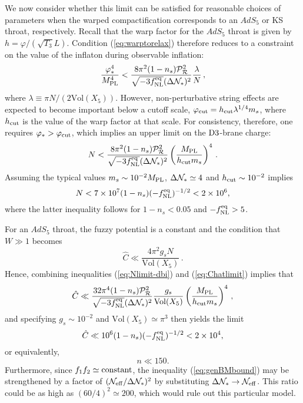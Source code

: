 We now consider whether this limit can be satisfied for reasonable choices 
of parameters when the warped compactification corresponds to 
an $AdS_5$ or KS throat, respectively. Recall that the warp 
factor for the $AdS_5$ throat is given by $h=\varphi/(\sqrt{T_3}L)$.  
Condition (\ref{eq:warptorelax}) therefore reduces to a constraint on the 
value of the inflaton during observable inflation: 
% 
\begin{equation}
\label{eq:phivalue-dbi}
\frac{\varphi_*^4}{M_{\mathrm{PL}}^4} < 
\frac{8\pi^2 (1-n_s)\mathcal{P}_{\mathcal{R}}^2 }{\sqrt{-3f_{\mathrm{NL}}^{\mathrm{eq}}} ( \Delta \mathcal{N}_*)^2} 
\frac{\lambda}{N} \,,
\end{equation}
%  
where $\lambda \equiv \pi N/(2 \mathrm{Vol}(X_5))$. 
However, non-perturbative string effects are expected to become 
important below a cutoff scale, $\varphi_{\rm cut} = 
h_{\rm cut} \lambda^{1/4} m_s$, where $h_{\rm cut}$ is the value of the 
warp factor at that scale. For consistency, therefore, one requires 
$\varphi_*>\varphi_{\rm cut}$, which implies an upper limit on the 
${\rm D3}$-brane charge: 
% 
\begin{equation}
\label{eq:Nlimit-dbi}
N< \frac{8\pi^2 (1-n_s)\mathcal{P}_{\mathcal{R}}^2 }{\sqrt{-3f_{\mathrm{NL}}^{\mathrm{eq}}} ( \Delta \mathcal{N}_*)^2}
\left( \frac{M_{\mathrm{PL}}}{h_{\rm cut}m_s} \right)^4  \,.
\end{equation}
% 
Assuming the typical values $m_s \sim 10^{-2}M_{\mathrm{PL}}$, 
$\Delta \mathcal{N}_* \simeq 4$ and 
$h_{\rm cut} \sim 10^{-2}$ implies
%   
\begin{equation}
N < 7 \times 10^7 (1-n_s)(-f_{\mathrm{NL}}^{\mathrm{eq}})^{-1/2} < 2\times 10^6, 
\end{equation}
% 
where 
the latter inequality follows for $1-n_s <0.05$ and $-f_{\mathrm{NL}}^{\mathrm{eq}}>5$. 


For an $AdS_5$ throat, the fuzzy potential 
is a constant and the condition that $W \gg 1$ becomes 
% 
\begin{equation}
\label{eq:Chatlimit}
\hat{C} \ll \frac{4\pi^2g_sN}{\mathrm{Vol}(X_5)} \,.
\end{equation}
% 
Hence, combining inequalities 
(\ref{eq:Nlimit-dbi}) and (\ref{eq:Chatlimit}) implies that
%  
\begin{equation}
\label{eq:nlimit-dbi}
\hat{C} \ll 
\frac{32 \pi^4 (1-n_s)\mathcal{P}_{\mathcal{R}}^2 }{\sqrt{-3f_{\mathrm{NL}}^{\mathrm{eq}}} ( \Delta \mathcal{N}_*)^2}
\frac{g_s}{\mathrm{Vol} (X_5) }
\left( \frac{M_{\mathrm{PL}}}{h_{\rm cut}m_s} \right)^4  \,,
\end{equation}
% 
and specifying $g_s \sim 10^{-2}$ and 
$\mathrm{Vol}(X_5) \simeq \pi^3$ then yields the limit  
% 
\begin{equation}
\hat{C} \ll 10^{6} (1-n_s)(-f_{\mathrm{NL}}^{\mathrm{eq}})^{-1/2} < 2 \times 10^4,
\end{equation}
% 
 or equivalently,
%   
\begin{equation}
n \ll 150.
\end{equation}
% 
Furthermore, since $f_1f_2 \simeq {\rm constant}$, 
the inequality (\ref{eq:genBMbound}) may be strengthened by a 
factor of $(   \mathcal{N}_\mathrm{eff} /\Delta \mathcal{N}_*)^2$ by 
substituting 
$\Delta \mathcal{N}_* \rightarrow \mathcal{N}_\mathrm{eff}$. This ratio 
could be as 
high as $(60/4)^2 \simeq 200 $, which would rule out this particular
model. 


